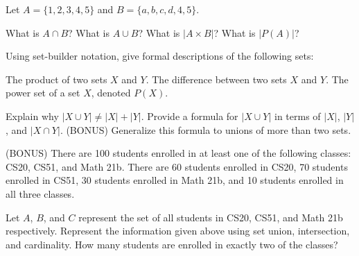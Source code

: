 \documentclass[solution, letterpaper]{cs20inclass}
\begin{document}
\pagebreak

\problem Let $A = \{1,2,3,4,5\}$ and $B = \{a,b,c,d,4,5\}$.

\subproblem What is $A \cap B$?
\subproblem What is $A \cup B$?
\subproblem What is $|A \times B|$?
\subproblem What is $|P(A)|$?

\begin{solution}
\end{solution}


\problem
Using set-builder notation, give formal descriptions of the following sets:

\subproblem The product of two sets $X$ and $Y$.
\subproblem The difference between two sets $X$ and $Y$.
\subproblem The power set of a set $X$, denoted $P(X)$.

\begin{solution}
\end{solution}


\problem

\subproblem Explain why $|X \cup Y| \neq |X| + |Y|$. 
\subproblem Provide a formula for $|X \cup Y|$ in terms of $|X|$, $|Y|$, and $|X \cap Y|$.
\subproblem (BONUS) Generalize this formula to unions of more than two sets.

\begin{solution}
\end{solution}


\problem
(BONUS) There are 100 students enrolled in at least one of the following classes: CS20, CS51, and Math 21b. There are 60 students enrolled in CS20, 70 students enrolled in CS51, 30 students enrolled in Math 21b, and 10 students enrolled in all three classes.

\subproblem Let $A$, $B$, and $C$ represent the set of all students in CS20, CS51, and Math 21b respectively. Represent the information given above using set union, intersection, and cardinality.
\subproblem How many students are enrolled in exactly two of the classes?

\begin{solution}
\end{solution}
\end{document}
